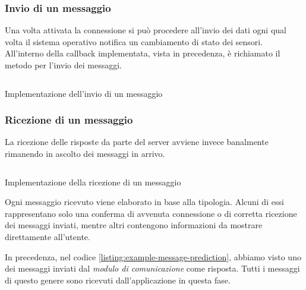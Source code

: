 \subsubsection{Invio di un messaggio}
Una volta attivata la connessione si può procedere all'invio dei dati ogni qual volta il sistema 
operativo notifica un cambiamento di stato dei sensori. All'interno della callback implementata, vista in precedenza, è
richiamato il metodo per l'invio dei messaggi.
\begin{listing}[H] 
    \inputminted[frame=single,framesep=10pt]{java}{assets/snippets/app/connection/send.java}
    \caption{Implementazione dell'invio di un messaggio}
\end{listing}

\newpage
\subsubsection{Ricezione di un messaggio}
La ricezione delle risposte da parte del server avviene invece banalmente rimanendo in ascolto 
dei messaggi in arrivo.
\begin{listing}[H] 
    \inputminted[frame=single,framesep=10pt]{java}{assets/snippets/app/connection/receive.java}
    \caption{Implementazione della ricezione di un messaggio}
\end{listing}
\vspace{5mm} %
\noindent Ogni messaggio ricevuto viene elaborato in base alla tipologia. Alcuni di essi rappresentano solo una conferma di avvenuta 
connessione o di corretta ricezione dei messaggi inviati, mentre altri contengono informazioni da mostrare direttamente all'utente.

\vspace{5mm} %
In precedenza, nel codice \ref{listing:example-message-prediction}, abbiamo visto uno dei messaggi inviati dal \textit{modulo di comunicazione} come risposta. 
Tutti i messaggi di questo genere sono ricevuti dall'applicazione in questa fase.
